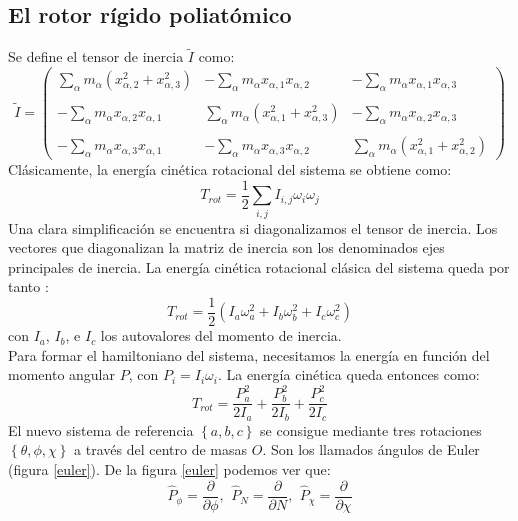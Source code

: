 \documentclass[a4paper]{article}
\begin{document}
\subsection{El rotor rígido poliatómico}
Se define el tensor de inercia $\tilde{I}$ como:
\begin{equation}
\tilde{I}=\left( \begin{array}{ccc}
\sum_{\alpha}m_{\alpha}\left(x^2_{\alpha,2}+x^2_{\alpha,3}\right) & -\sum_{\alpha}m_{\alpha}x_{\alpha,1}x_{\alpha,2} & -\sum_{\alpha}m_{\alpha}x_{\alpha,1}x_{\alpha,3} \\\\
-\sum_{\alpha}m_{\alpha}x_{\alpha,2}x_{\alpha,1} & \sum_{\alpha}m_{\alpha}\left(x^2_{\alpha,1}+x^2_{\alpha,3}\right) &-\sum_{\alpha}m_{\alpha}x_{\alpha,2}x_{\alpha,3} \\\\
-\sum_{\alpha}m_{\alpha}x_{\alpha,3}x_{\alpha,1} & -\sum_{\alpha}m_{\alpha}x_{\alpha,3}x_{\alpha,2} & \sum_{\alpha}m_{\alpha}\left(x^2_{\alpha,1}+x^2_{\alpha,2}\right) \end{array} \right)
\end{equation}
Clásicamente, la energía cinética rotacional del sistema se obtiene como:
\begin{equation}
T_{rot}=\frac{1}{2}\sum_{i,j}I_{i,j}\omega_i\omega_j
\end{equation}
Una clara simplificación se encuentra si diagonalizamos el tensor de inercia. Los vectores que diagonalizan la matriz de inercia son los denominados ejes principales de inercia. La energía cinética rotacional clásica del sistema queda por tanto \cite{marion2013}:
\begin{equation}
T_{rot}=\frac{1}{2}\left(I_a\omega^2_a + I_b\omega^2_b + I_c\omega^2_c\right) 
\end{equation}
con $I_a$, $I_b$, e $I_c$ los autovalores del momento de inercia.\\
Para formar el hamiltoniano del sistema, necesitamos la energía en función del momento angular $P$, con $P_i=I_i\omega_i$.
La energía cinética queda entonces como:
\begin{equation}
T_{rot}=\frac{P_a^2}{2I_a}+\frac{P_b^2}{2I_b}+\frac{P_c^2}{2I_c}
\end{equation}
El nuevo sistema de referencia $\left\lbrace a,b,c \right\rbrace$ se consigue mediante tres rotaciones  $\left\lbrace \theta,\phi,\chi \right\rbrace$ a través del centro de masas $O$. Son los llamados ángulos de Euler (figura \ref{euler}).
De la figura \ref{euler} podemos ver que:
\begin{equation}
\hat P_{\phi}=\frac{\partial}{\partial \phi},\,\ \hat P_{N}=\frac{\partial}{\partial N},\,\ \hat P_{\chi}=\frac{\partial}{\partial \chi}
\end{equation}
\end{document}

